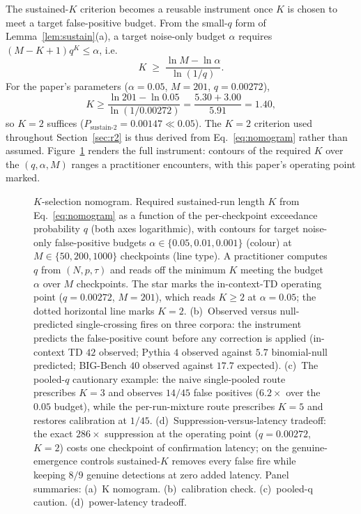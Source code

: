 \documentclass[11pt]{article}
\theoremstyle{plain}
\theoremstyle{definition}
\begin{document}
The sustained-$K$ criterion becomes a reusable instrument once $K$ is chosen to meet a
target false-positive budget. From the small-$q$ form of Lemma~\ref{lem:sustain}(a), a
target noise-only budget $\alpha$ requires $(M-K+1)q^{K}\leq\alpha$, i.e.
\begin{equation}\label{eq:nomogram}
  K \;\geq\; \frac{\ln M - \ln\alpha}{\ln(1/q)}.
\end{equation}
For the paper's parameters ($\alpha=0.05$, $M=201$, $q=0.00272$),
\[
  K \geq \frac{\ln 201 - \ln 0.05}{\ln(1/0.00272)}
      = \frac{5.30 + 3.00}{5.91}
      = 1.40,
\]
so $K=2$ suffices ($P_{\mathrm{sustain}\text{-}2}=0.00147\ll0.05$). The $K=2$ criterion used
throughout Section~\ref{sec:r2} is thus derived from Eq.~\eqref{eq:nomogram} rather
than assumed. Figure~\ref{fig:nomogram} renders the full instrument: contours of the
required $K$ over the $(q,\alpha,M)$ ranges a practitioner encounters, with this paper's
operating point marked.

\begin{figure}[htbp]
\centering
{}
\caption{$K$-selection nomogram. Required sustained-run length $K$ from
Eq.~\eqref{eq:nomogram} as a function of the per-checkpoint exceedance probability $q$
(both axes logarithmic), with contours for target noise-only false-positive budgets
$\alpha\in\{0.05,0.01,0.001\}$ (colour) at $M\in\{50,200,1000\}$ checkpoints (line type).
A practitioner computes $q$ from $(N,p,\tau)$ and reads off the minimum $K$ meeting the
budget $\alpha$ over $M$ checkpoints. The star marks the in-context-TD operating point
($q=0.00272$, $M=201$), which reads $K\geq2$ at $\alpha=0.05$; the dotted horizontal line
marks $K=2$.
(b)~Observed versus null-predicted single-crossing fires on three corpora: the
instrument predicts the false-positive count before any correction is applied
(in-context TD $42$ observed; Pythia $4$ observed against $5.7$ binomial-null
predicted; BIG-Bench $40$ observed against $17.7$ expected).
(c)~The pooled-$q$ cautionary example: the naive single-pooled route prescribes
$K=3$ and observes $14/45$ false positives ($6.2\times$ over the $0.05$
budget), while the per-run-mixture route prescribes $K=5$ and restores
calibration at $1/45$.
(d)~Suppression-versus-latency tradeoff: the exact $286\times$ suppression at
the operating point ($q=0.00272$, $K=2$) costs one checkpoint of confirmation
latency; on the genuine-emergence controls sustained-$K$ removes every false
fire while keeping $8/9$ genuine detections at zero added latency.
Panel summaries: (a)~K nomogram. (b)~calibration check. (c)~pooled-q caution. (d)~power-latency tradeoff.}
\label{fig:nomogram}
\end{figure}
\end{document}
